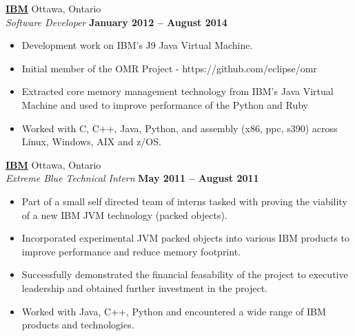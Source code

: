 \documentclass[margin,line]{res}
\begin{document}
\begin{resume}
        \href{http://www.ibm.com/ca/en/}{\bf IBM} {\hfill Ottawa, Ontario}\\
      {\em Software Developer} \hfill {\bf January 2012 -- August 2014}
      \begin{itemize} \itemsep -2pt
        \item Development work on IBM's J9 Java Virtual Machine.
        \item Initial member of the OMR Project - https://github.com/eclipse/omr
        \item Extracted core memory management technology from IBM's Java Virtual Machine and used to improve performance of the Python and Ruby
        \item Worked with C, C++, Java, Python, and assembly (x86, ppc, s390) across Linux, Windows, AIX and z/OS.

      \end{itemize}  

        \href{http://www.ibm.com/ca/en/}{\bf IBM} {\hfill Ottawa, Ontario}\\
      {\em Extreme Blue Technical Intern} \hfill {\bf May 2011 -- August 2011}
      \begin{itemize} \itemsep -2pt
        \item Part of a small self directed team of interns tasked with proving the viability of a new IBM JVM technology (packed objects).
        \item Incorporated experimental JVM packed objects into various IBM products to improve performance and reduce memory footprint.
        \item Successfully demonstrated the financial feasability of the project to executive leadership and obtained further investment in the project.
        \item Worked with Java, C++, Python and encountered a wide range of IBM products and technologies.
      \end{itemize}
    


\end{resume}
\end{document}
